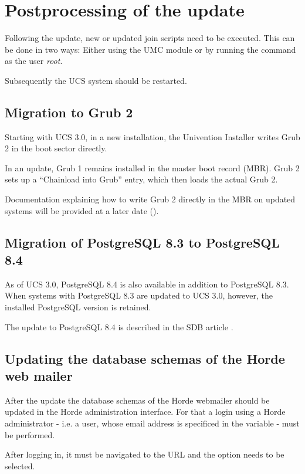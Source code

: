 \chapter{Postprocessing of the update}
Following the update, new or updated join scripts need to be executed.
This can be done in two ways: Either using the UMC module 
 or by running the command
 as the user \emph{root}.

Subsequently the UCS system should be restarted.

\section{Migration to Grub 2}
Starting with UCS 3.0, in a new installation, the Univention Installer writes Grub 2 in the
boot sector directly.

In an update, Grub 1 remains installed in the master boot record
(MBR). Grub 2 sets up a ``Chainload into Grub'' entry, which then
loads the actual Grub 2.

Documentation explaining how to write Grub 2 directly in the MBR on
updated systems will be provided at a later date ().

\section{Migration of PostgreSQL 8.3 to PostgreSQL 8.4}
As of UCS 3.0, PostgreSQL 8.4 is also available in addition to
PostgreSQL 8.3. When systems with PostgreSQL 8.3 are updated to UCS
3.0, however, the installed PostgreSQL version is retained.

The update to PostgreSQL 8.4 is described in the SDB
article .

\section{Updating the database schemas of the Horde web mailer}
After the update the database schemas of the Horde webmailer should be
updated in the Horde administration interface. For that a login using
a Horde administrator - i.e. a user, whose email address is specificed
in the \ucsUCR{} variable  - must be
performed.

After logging in, it must be navigated to the URL
 and the option 
 needs to be selected.

